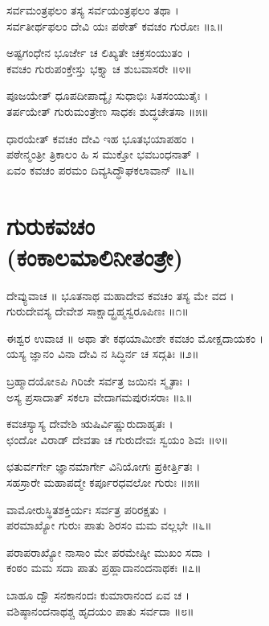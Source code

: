ಸರ್ವಮಂತ್ರಫಲಂ ತಸ್ಯ ಸರ್ವಯಂತ್ರಫಲಂ ತಥಾ ।\\
ಸರ್ವತೀರ್ಥಫಲಂ ದೇವಿ ಯಃ ಪಠೇತ್ ಕವಚಂ ಗುರೋಃ ॥೩॥

ಅಷ್ಟಗಂಧೇನ ಭೂರ್ಜೇ ಚ ಲಿಖ್ಯತೇ ಚಕ್ರಸಂಯುತಂ ।\\
ಕವಚಂ ಗುರುಪಂಕ್ತೇಸ್ತು ಭಕ್ತ್ಯಾ ಚ ಶುಬವಾಸರೇ ॥೪॥

ಪೂಜಯೇತ್ ಧೂಪದೀಪಾದ್ಯೈಃ ಸುಧಾಭಿಃ ಸಿತಸಂಯುತೈಃ ।\\
ತರ್ಪಯೇತ್ ಗುರುಮಂತ್ರೇಣ ಸಾಧಕಃ ಶುದ್ಧಚೇತಸಾ ॥೫॥

ಧಾರಯೇತ್ ಕವಚಂ ದೇವಿ ಇಹ ಭೂತಭಯಾಪಹಂ ।\\
ಪಠೇನ್ಮಂತ್ರೀ ತ್ರಿಕಾಲಂ ಹಿ ಸ ಮುಕ್ತೋ ಭವಬಂಧನಾತ್ ।\\
ಏವಂ ಕವಚಂ ಪರಮಂ ದಿವ್ಯಸಿದ್ಧೌಘಕಲಾವಾನ್ ॥೬॥



\section{ಗುರುಕವಚಂ \\(ಕಂಕಾಲಮಾಲಿನೀತಂತ್ರೇ)}
ದೇವ್ಯುವಾಚ ॥
ಭೂತನಾಥ  ಮಹಾದೇವ  ಕವಚಂ ತಸ್ಯ ಮೇ ವದ ।\\
ಗುರುದೇವಸ್ಯ ದೇವೇಶ  ಸಾಕ್ಷಾದ್ಬ್ರಹ್ಮಸ್ವರೂಪಿಣಃ ॥೧॥

ಈಶ್ವರ ಉವಾಚ ॥
ಅಥಾ ತೇ ಕಥಯಾಮೀಶೇ  ಕವಚಂ ಮೋಕ್ಷದಾಯಕಂ ।\\
ಯಸ್ಯ ಜ್ಞಾನಂ ವಿನಾ ದೇವಿ  ನ ಸಿದ್ಧಿರ್ನ ಚ ಸದ್ಗತಿಃ ॥೨॥

ಬ್ರಹ್ಮಾದಯೋಽಪಿ ಗಿರಿಜೇ  ಸರ್ವತ್ರ ಜಯಿನಃ ಸ್ಮೃತಾಃ ।\\
ಅಸ್ಯ ಪ್ರಸಾದಾತ್ ಸಕಲಾ ವೇದಾಗಮಪುರಃಸರಾಃ ॥೩॥

ಕವಚಸ್ಯಾಸ್ಯ ದೇವೇಶಿ  ಋಷಿರ್ವಿಷ್ಣುರುದಾಹೃತಃ ।\\
ಛಂದೋ ವಿರಾಡ್ ದೇವತಾ ಚ ಗುರುದೇವಃ ಸ್ವಯಂ ಶಿವಃ ॥೪॥

ಛತುರ್ವರ್ಗೇ ಜ್ಞಾನಮಾರ್ಗೇ ವಿನಿಯೋಗಃ ಪ್ರಕೀರ್ತ್ತಿತಃ ।\\
ಸಹಸ್ರಾರೇ ಮಹಾಪದ್ಮೇ ಕರ್ಪೂರಧವಲೋ ಗುರುಃ ॥೫॥

ವಾಮೋರುಸ್ಥಿತಶಕ್ತಿರ್ಯಃ ಸರ್ವತ್ರ ಪರಿರಕ್ಷತು ।\\
ಪರಮಾಖ್ಯೋ ಗುರುಃ ಪಾತು ಶಿರಸಂ ಮಮ ವಲ್ಲಭೇ  ॥೬॥

ಪರಾಪರಾಖ್ಯೋ ನಾಸಾಂ ಮೇ ಪರಮೇಷ್ಠೀ ಮುಖಂ ಸದಾ ।\\
ಕಂಠಂ ಮಮ ಸದಾ ಪಾತು ಪ್ರಹ್ಲಾದಾನಂದನಾಥಕಃ ॥೭॥

ಬಾಹೂ ದ್ವೌ ಸನಕಾನಂದಃ ಕುಮಾರಾನಂದ ಏವ ಚ ।\\
ವಶಿಷ್ಠಾನಂದನಾಥಶ್ಚ ಹೃದಯಂ ಪಾತು ಸರ್ವದಾ ॥೮॥

